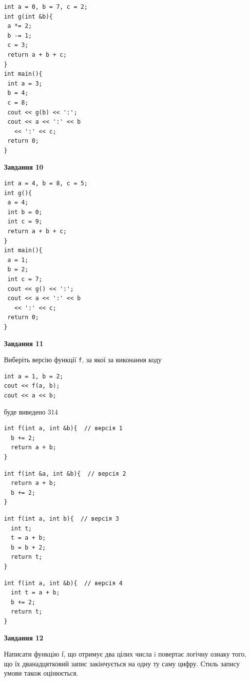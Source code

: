 \documentclass[12pt, ukrainian]{article}
\def\code#1{\Verb!#1!}
\begin{document}
{\begin {large}
\begin{minipage}[t]{7.0cm}
\begin{verbatim}
int a = 0, b = 7, c = 2;
int g(int &b){
 a *= 2;
 b -= 1;
 c = 3;
 return a + b + c;
}
int main(){
 int a = 3;
 b = 4;
 c = 8;
 cout << g(b) << ':';
 cout << a << ':' << b 
   << ':' << c;
 return 0;
}
\end{verbatim}



\begin{center}
\textbf{Завдання 10}
\end{center}
\vspace{-8mm}

\begin{verbatim}
int a = 4, b = 8, c = 5;
int g(){
 a = 4;
 int b = 0;
 int c = 9;
 return a + b + c;
}
int main(){
 a = 1;
 b = 2;
 int c = 7;
 cout << g() << ':';
 cout << a << ':' << b 
   << ':' << c;
 return 0;
}
\end{verbatim}

\end{minipage}
\vline \hspace{1mm}
\begin{minipage}[t]{11.0cm}

\begin{center}
\textbf{Завдання 11}
\end{center}
Виберіть версію функції \code{f}, за якої за виконання коду
\begin{verbatim}
int a = 1, b = 2;
cout << f(a, b);
cout << a << b;
\end{verbatim}

буде виведено 314

\begin{verbatim}
int f(int a, int &b){  // версія 1
  b += 2;
  return a + b;
}
\end{verbatim}

\vspace{-8mm}\begin{verbatim}
int f(int &a, int &b){  // версія 2
  return a + b;
  b += 2;
}
\end{verbatim}

\vspace{-8mm}\begin{verbatim}
int f(int a, int b){  // версія 3
  int t;
  t = a + b;
  b = b + 2;
  return t;
}
\end{verbatim}

\vspace{-8mm}\begin{verbatim}
int f(int a, int &b){  // версія 4
  int t = a + b;
  b += 2;
  return t;
}
\end{verbatim}



\begin{center}
\textbf{Завдання 12}
\end{center}

Написати функцiю f, що отримує два цілих числа i повертає логічну ознаку того, що їх дванадцятковий запис закінчується на одну ту саму цифру. Стиль запису умови також оцінюється.\par

\end{minipage}

\end {large}}
\end{document}
